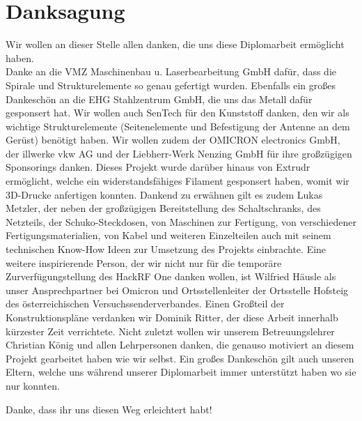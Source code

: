 \chapter*{Danksagung}
\label{chap:Danksagung}
Wir wollen an dieser Stelle allen danken, die uns diese Diplomarbeit ermöglicht haben.\\ Danke an die VMZ Maschinenbau u. Laserbearbeitung GmbH dafür, dass die Spirale und Strukturelemente so genau gefertigt wurden. Ebenfalls ein großes Dankeschön an die EHG Stahlzentrum GmbH, die uns das Metall dafür gesponsert hat. Wir wollen auch SenTech für den Kunststoff danken, den wir als wichtige Strukturelemente (Seitenelemente und Befestigung der Antenne an dem Gerüst) benötigt haben. Wir wollen zudem der OMICRON electronics GmbH, der illwerke vkw AG und der Liebherr-Werk Nenzing GmbH für ihre großzügigen Sponsorings danken. Dieses Projekt wurde darüber hinaus von Extrudr ermöglicht, welche ein widerstandsfähiges Filament gesponsert haben, womit wir 3D-Drucke anfertigen konnten. Dankend zu erwähnen gilt es zudem Lukas Metzler, der neben der großzügigen Bereitstellung des Schaltschranks, des Netzteils, der Schuko-Steckdosen, von Maschinen zur Fertigung, von verschiedener Fertigungsmaterialien, von Kabel und weiteren Einzelteilen auch mit seinem technischen Know-How Ideen zur Umsetzung des Projekts einbrachte. Eine weitere inspirierende Person, der wir nicht nur für die temporäre Zurverfügungstellung des HackRF One danken wollen, ist Wilfried Häusle als unser Ansprechpartner bei Omicron und Ortsstellenleiter der Ortsstelle Hofsteig des österreichischen Versuchssenderverbandes. Einen Großteil der Konstruktionspläne verdanken wir Dominik Ritter, der diese Arbeit innerhalb kürzester Zeit verrichtete. Nicht zuletzt wollen wir unserem Betreuungslehrer Christian König und allen Lehrpersonen danken, die genauso motiviert an diesem Projekt gearbeitet haben wie wir selbst.
Ein großes Dankeschön gilt auch unseren Eltern, welche uns während unserer Diplomarbeit immer unterstützt haben wo sie nur konnten.

Danke, dass ihr uns diesen Weg erleichtert habt!
